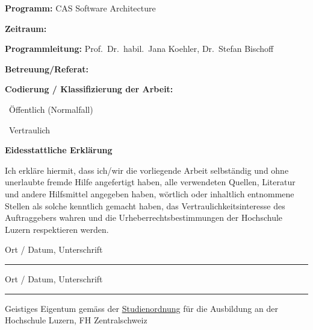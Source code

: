 \vspace{0.8cm}

\noindent
\textbf{Programm:} CAS Software Architecture

\vspace{0.6cm}

\noindent
\textbf{Zeitraum:}

\vspace{0.8cm}

\noindent
\textbf{Programmleitung:} Prof.\ Dr.\ habil.\ Jana Koehler, Dr.\ Stefan Bischoff

\vspace{0.6cm}

\noindent
\textbf{Betreuung/Referat:} 

\vspace{1.2cm}

\noindent
\textbf{Codierung / Klassifizierung der Arbeit:}

\vspace{0.4cm}

\noindent
\checkedbox\ Öffentlich (Normalfall)

\noindent
\uncheckedbox\ Vertraulich

\vspace{1.2cm}

\noindent
\textbf{Eidesstattliche Erklärung}

\vspace{0.4cm}

\noindent
Ich erkläre hiermit, dass ich/wir die vorliegende Arbeit selbständig und ohne unerlaubte fremde Hilfe angefertigt haben, alle verwendeten Quellen, Literatur und andere Hilfsmittel angegeben haben, wörtlich oder inhaltlich entnommene Stellen als solche kenntlich gemacht haben, das Vertraulichkeitsinteresse des Auftraggebers wahren und die Urheberrechtsbestimmungen der Hochschule Luzern respektieren werden.

\vspace{1.4cm}

\noindent
Ort / Datum, Unterschrift \hspace{0.7em}\rule{10.2cm}{0.4pt}

\vspace{1.0cm}

\noindent
Ort / Datum, Unterschrift \hspace{0.7em}\rule{10.2cm}{0.4pt}

\vspace{1.6cm}

\noindent
Geistiges Eigentum gemäss der
\href{https://srl.lu.ch/app/de/texts_of_law/521/versions/3884}{Studienordnung}
für die Ausbildung an der Hochschule Luzern, FH Zentralschweiz

